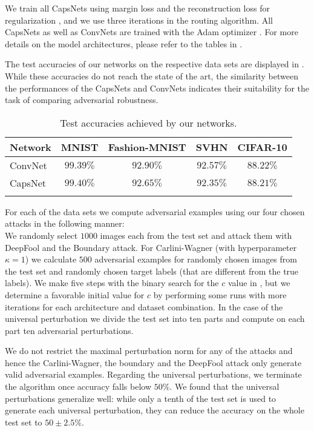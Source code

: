 We train all CapsNets using margin loss and the reconstruction loss for regularization \citep{capsules}, and we use three iterations in the routing algorithm.
All CapsNets as well as ConvNets are trained with the Adam optimizer \citep{adam}.
For more details on the model architectures, please refer to the tables in .

The test accuracies of our networks on the respective data sets are displayed in .
While these accuracies do not reach the state of the art, the similarity between the performances of the CapsNets and ConvNets indicates their suitability for the task of comparing adversarial robustness.

\begin{table}	
	\centering
	\begin{tabular}{lcccc}
		\toprule
		Network       & MNIST & Fashion-MNIST & SVHN & CIFAR-10  \\
		\midrule
		ConvNet           & $99.39\%$ & $92.90\%$ & $92.57\%$ & $88.22\%$ \\
		CapsNet           & $99.40\%$ & $92.65\%$ & $92.35\%$ & $88.21\%$ \\
		\bottomrule\\
	\end{tabular}
	\caption[Test accuracies]{Test accuracies achieved by our networks.}
	\label{tab:accuracies}
\end{table}

For each of the data sets we compute adversarial examples using our four chosen attacks in the following manner:\\
We randomly select $1000$ images each from the test set and attack them with DeepFool and the Boundary attack.
For Carlini-Wagner (with hyperparameter $\kappa=1$) we calculate $500$ adversarial examples for randomly chosen images from the test set and randomly chosen target labels (that are different from the true labels).
We make five steps with the binary search for the $c$ value in , but we determine a favorable initial value for $c$ by performing some runs with more iterations for each architecture and dataset combination.
In the case of the universal perturbation we divide the test set into ten parts and compute on each part ten adversarial perturbations.

We do not restrict the maximal perturbation norm for any of the attacks and hence the Carlini-Wagner, the boundary and the DeepFool attack only generate valid adversarial examples.
Regarding the universal perturbations, we terminate the algorithm once accuracy falls below $50\%$.
We found that the universal perturbations generalize well: while only a tenth of the test set is used to generate each universal perturbation, they can reduce the accuracy on the whole test set to $50\pm2.5\%$.

